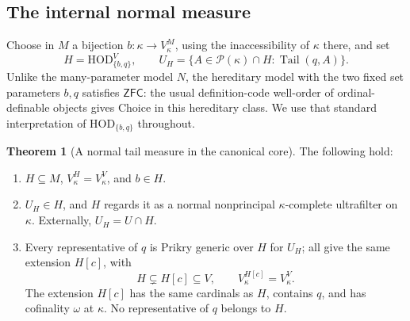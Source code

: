 \documentclass[11pt,letterpaper]{article}
\theoremstyle{definition}
\newtheorem{theorem}[definition]{Theorem}
\numberwithin{equation}{section}
\newcommand{\ZFC}{\mathsf{ZFC}}
\newcommand{\HOD}{\mathrm{HOD}}
\newcommand{\tail}{\operatorname{Tail}}
\newcommand{\powerset}{\mathcal P}
\begin{document}
\subsection{The internal normal measure}

Choose in $M$ a bijection $b:\kappa\to V_\kappa^M$, using the
inaccessibility of $\kappa$ there, and set
\[
 H=\HOD_{\{b,q\}}^V,
 \qquad
 U_H=\{A\in\powerset(\kappa)\cap H:\tail(q,A)\}.
\]
Unlike the many-parameter model $N$, the hereditary model with the two
fixed set parameters $b,q$ satisfies $\ZFC$: the usual definition-code
well-order of ordinal-definable objects gives Choice in this hereditary
class. We use that standard interpretation of $\HOD_{\{b,q\}}$ throughout.

\begin{theorem}[A normal tail measure in the canonical core]\label{thm:core}
The following hold:
\begin{enumerate}
\item $H\subseteq M$, $V_\kappa^H=V_\kappa^V$, and $b\in H$.
\item $U_H\in H$, and $H$ regards it as a normal nonprincipal
$\kappa$-complete ultrafilter on $\kappa$. Externally, $U_H=U\cap H$.
\item Every representative of $q$ is Prikry generic over $H$ for $U_H$;
all give the same extension $H[c]$, with
\[
 H\subsetneq H[c]\subseteq V,
 \qquad V_\kappa^{H[c]}=V_\kappa^V.
\]
The extension $H[c]$ has the same cardinals as $H$, contains $q$, and has
cofinality $\omega$ at $\kappa$. No representative of $q$ belongs to $H$.
\end{enumerate}
\end{theorem}
\end{document}
